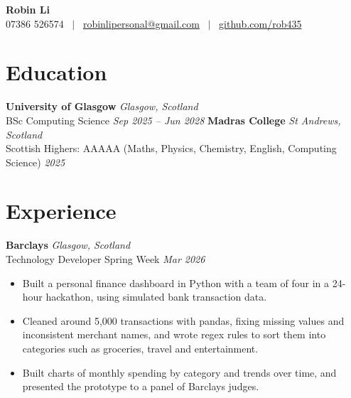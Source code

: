 \documentclass[11pt,a4paper]{article}
\begin{document}
\noindent
{\Huge \textbf{Robin Li}} \\[3pt]
07386 526574 \ $|$ \ \href{mailto:robinlipersonal@gmail.com}{robinlipersonal@gmail.com} \ $|$ \ \href{https://github.com/rob435}{github.com/rob435}
\section{Education}
\noindent \textbf{University of Glasgow} \hfill \textit{Glasgow, Scotland} \\
BSc Computing Science \hfill \textit{Sep 2025 -- Jun 2028}
\vspace{4pt}
\noindent \textbf{Madras College} \hfill \textit{St Andrews, Scotland} \\
Scottish Highers: AAAAA (Maths, Physics, Chemistry, English, Computing Science) \hfill \textit{2025}
\section{Experience}
\noindent \textbf{Barclays} \hfill \textit{Glasgow, Scotland} \\
Technology Developer Spring Week \hfill \textit{Mar 2026}
\begin{itemize}
    \item Built a personal finance dashboard in Python with a team of four in a 24-hour hackathon, using simulated bank transaction data.
    \item Cleaned around 5,000 transactions with pandas, fixing missing values and inconsistent merchant names, and wrote regex rules to sort them into categories such as groceries, travel and entertainment.
    \item Built charts of monthly spending by category and trends over time, and presented the prototype to a panel of Barclays judges.
\end{itemize}
\end{document}
